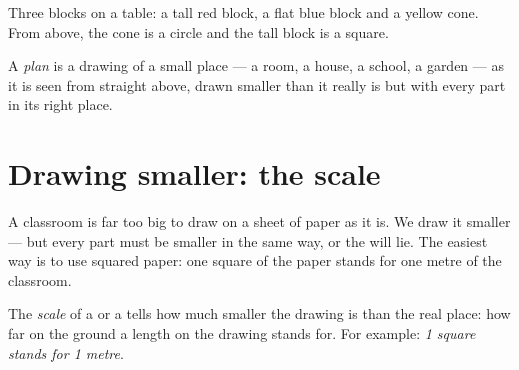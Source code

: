 \begin{omfigure}

{\small Three blocks on a table: a tall red block, a flat blue block and a
yellow cone. From above, the cone is a circle and the tall block is a
square.}
\label{fig:g2:drawing-to-map:blocks}
\end{omfigure}

\begin{definition}[Plan]\label{def:g2:drawing-to-map:plan}
A \emph{plan} is a drawing of a small place --- a room, a
house, a school, a garden --- as it is seen from straight above, drawn
smaller than it really is but with every part in its right place.
\end{definition}

\section{Drawing smaller: the scale}

A classroom is far too big to draw on a sheet of paper as it is. We draw it
smaller --- but every part must be smaller in the same way, or the 
will lie. The easiest way is to use squared paper: one square of the paper
stands for one metre of the classroom.

\begin{definition}[Scale]\label{def:g2:drawing-to-map:scale}
The \emph{scale} of a  or a  tells how much smaller the
drawing is than the real place: how far on the ground a length on the
drawing stands for. For example: \emph{1 square stands for 1 metre}.
\end{definition}


